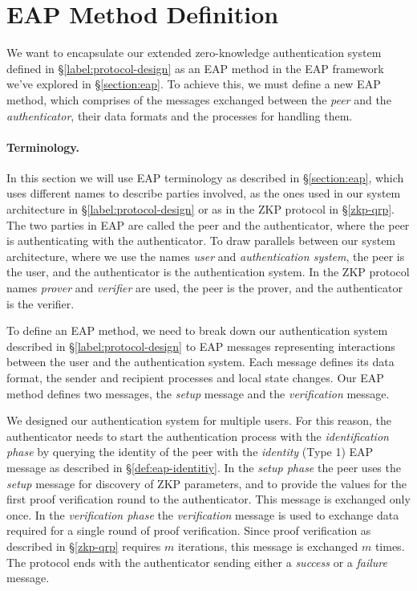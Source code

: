 \section{EAP Method Definition}
\label{section:eap-84-definition}
We want to encapsulate our extended zero-knowledge authentication system defined in \S\ref{label:protocol-design} as an EAP method in the EAP framework we've explored in \S\ref{section:eap}.
To achieve this, we must define a new EAP method, which comprises of the messages exchanged between the \textit{peer} and the \textit{authenticator}, their data formats and the processes for handling them.

\paragraph{Terminology.}
In this section we will use EAP terminology as described in \S\ref{section:eap}, which uses different names to describe parties involved, as the ones used in our system architecture in \S\ref{label:protocol-design} or as in the ZKP protocol in \S\ref{zkp-qrp}.
The two parties in EAP are called the peer and the authenticator, where the peer is authenticating with the authenticator.
To draw parallels between our system architecture, where we use the names \textit{user} and \textit{authentication system}, the peer is the user, and the authenticator is the authentication system.
In the ZKP protocol names \textit{prover} and \textit{verifier} are used, the peer is the prover, and the authenticator is the verifier.

\bigskip
\noindent
To define an EAP method, we need to break down our authentication system described in \S\ref{label:protocol-design} to EAP messages representing interactions between the user and the authentication system.
Each message defines its data format, the sender and recipient processes and local state changes.
Our EAP method defines two messages, the \textit{setup} message and the \textit{verification} message.

We designed our authentication system for multiple users. 
For this reason, the authenticator needs to start the authentication process with the \textit{identification phase} by querying the identity of the peer with the \textit{identity} (Type 1) EAP message as described in \S\ref{def:eap-identitiy}.
In the \textit{setup phase} the peer uses the \textit{setup} message for discovery of ZKP parameters, and to provide the values for the first proof verification round to the authenticator.
This message is exchanged only once.
In the \textit{verification phase} the \textit{verification} message is used to exchange data required for a single round of proof verification. Since proof verification as described in \S\ref{zkp-qrp} requires $m$ iterations, this message is exchanged $m$ times.
The protocol ends with the authenticator sending either a \textit{success} or a \textit{failure} message.

